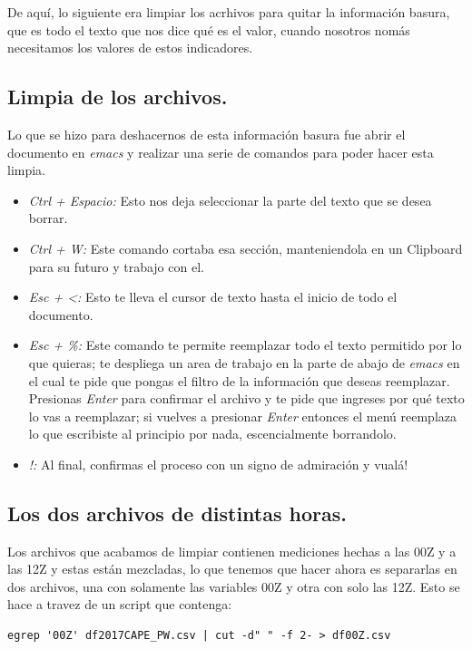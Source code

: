 \documentclass{article}
\begin{document}
De aquí, lo siguiente era limpiar los acrhivos para quitar la información basura, que es todo el texto que nos dice qué es el valor, cuando nosotros nomás necesitamos los valores de estos indicadores.

\subsection{Limpia de los archivos.}
Lo que se hizo para deshacernos de esta información basura fue abrir el documento en \textit{emacs} y realizar una serie de comandos para poder hacer esta limpia.
    \begin{itemize}
        \item \textit{Ctrl + Espacio:} Esto nos deja seleccionar la parte del texto que         se desea borrar.
        \item \textit{Ctrl + W:} Este comando cortaba esa sección, manteniendola en un           Clipboard para su futuro y trabajo con el.
        \item \textit{Esc + <:} Esto te lleva el cursor de texto hasta el inicio de todo         el documento.
        \item \textit{Esc + \%:} Este comando te permite reemplazar todo el texto                 permitido por lo que quieras; te despliega un area de trabajo en la parte de             abajo de \textit{emacs} en el cual te pide que pongas el filtro de la                   información que deseas reemplazar. Presionas \textit{Enter} para confirmar             el archivo y te pide que ingreses por qué texto lo vas a reemplazar; si vuelves         a presionar \textit{Enter} entonces el menú reemplaza lo que escribiste al                 principio por nada, escencialmente borrandolo.
        \item \textit{!:} Al final, confirmas el proceso con un signo de admiración y             vualá!
    \end{itemize}

\subsection{Los dos archivos de distintas horas.}
Los archivos que acabamos de limpiar contienen mediciones hechas a las 00Z y a las 12Z y estas están mezcladas, lo que tenemos que hacer ahora es separarlas en dos archivos, una con solamente las variables 00Z y otra con solo las 12Z.
Esto se hace a travez de un script que contenga:
\begin{verbatim}
egrep '00Z' df2017CAPE_PW.csv | cut -d" " -f 2- > df00Z.csv
\end{verbatim}
\end{document}
